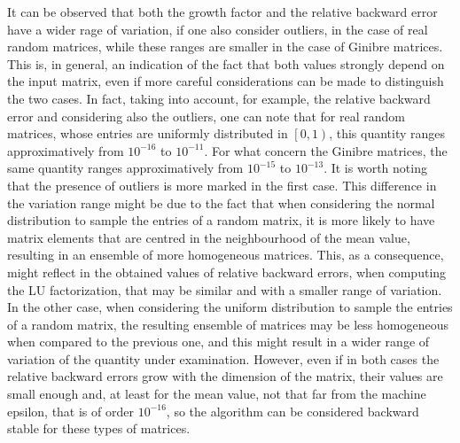 \documentclass[a4paper,11pt]{report}
\begin{document}
\noindent It can be observed that both the growth factor and the relative backward error have a wider rage of variation, if one also consider outliers, in the case of real random matrices, while these ranges are smaller in the case of Ginibre matrices. This is, in general, an indication of the fact that both values strongly depend on the input matrix, even if more careful considerations can be made to distinguish the two cases. In fact, taking into account, for example, the relative backward error and considering also the outliers, one can note that for real random matrices, whose entries are uniformly distributed in $\left[0,1\right)$, this quantity ranges approximatively from $10^{-16}$ to $10^{-11}$. For what concern the Ginibre matrices, the same quantity ranges approximatively from $10^{-15}$ to $10^{-13}$. It is worth noting that the presence of outliers is more marked in the first case.
This difference in the variation range might be due to the fact that when considering the normal distribution to sample the entries of a random matrix, it is more likely to have matrix elements that are centred in the neighbourhood of the mean value, resulting in an ensemble of more homogeneous matrices. This, as a consequence, might reflect in the obtained values of relative backward errors, when computing the LU factorization, that may be similar and with a smaller range of variation. In the other case, when considering the uniform distribution to sample the entries of a random matrix, the resulting ensemble of matrices may be less homogeneous when compared to the previous one, and this might result in a wider range of variation of the quantity under examination. However, even if in both cases the relative backward errors grow with the dimension of the matrix, their values are small enough and, at least for the mean value, not that far from the machine epsilon, that is of order $10^{-16}$, so the algorithm can be considered backward stable for these types of matrices.\\
\end{document}
